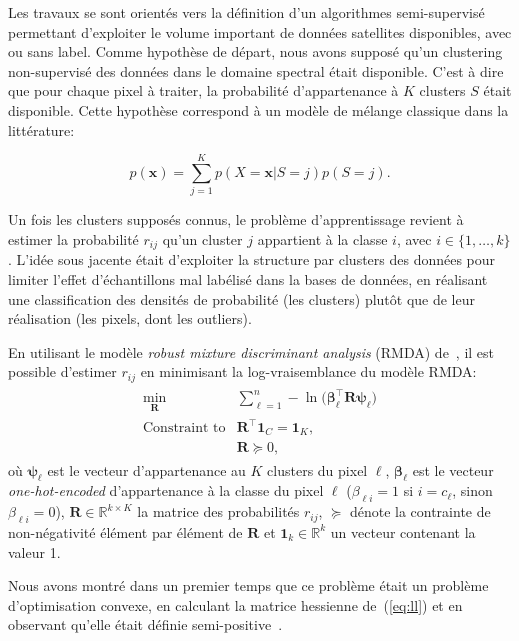 Les travaux se sont orientés vers la définition d'un algorithmes semi-supervisé permettant d'exploiter le volume important de données satellites disponibles, avec ou sans label. Comme hypothèse de départ, nous avons supposé qu'un clustering non-supervisé des données dans le domaine spectral était disponible. C'est à dire que pour chaque pixel à traiter, la probabilité d'appartenance à \(K\) clusters \(S\) était disponible. Cette hypothèse correspond à un modèle de mélange classique dans la littérature:

\[p(\mathbf{x}) = \sum_{j=1}^Kp(X=\mathbf{x}|S=j)p(S=j).\]

Un fois les clusters supposés connus, le problème d'apprentissage revient à estimer la probabilité \(r_{ij}\) qu'un cluster \(j\) appartient à la classe \(i\), avec \(i\in\{1, \ldots,k\}\). L'idée sous jacente était d'exploiter la structure par clusters des données pour limiter l'effet d'échantillons mal labélisé dans la bases de données, en réalisant une classification des densités de probabilité (les clusters) plutôt que de leur réalisation (les pixels, dont les outliers).

En utilisant le modèle \emph{robust mixture discriminant analysis} (RMDA) de~\cite{bouveyron-2009-robus-super}, il est possible d'estimer \(r_{ij}\) en minimisant la log-vraisemblance du modèle RMDA:
\begin{eqnarray}
  \label{eq:ll}
  \begin{array}{rl}
    \displaystyle{\min_{\mathbf{R}}}
   &\displaystyle{\sum_{\ell=1}^n -\ln\big(\boldsymbol{\beta}_\ell^\top\mathbf{R}\boldsymbol{\psi}_\ell\big)}\\
   \text{Constraint to} & \mathbf{R}^\top\mathbf{1}_C = \mathbf{1}_K,\\
  & \mathbf{R} \succcurlyeq 0,
  \end{array}
\end{eqnarray}
où \(\boldsymbol{\psi}_\ell\) est le vecteur d'appartenance au \(K\) clusters du pixel \(\ell\), \(\boldsymbol{\beta}_\ell\) est le vecteur \emph{one-hot-encoded} d'appartenance à la classe du pixel \(\ell\) (\(\beta_{\ell i}=1\) si \(i=c_\ell\), sinon \(\beta_{\ell i}=0\)),  \(\mathbf{R}\in\mathbb{R}^{k\times K}\) la matrice des probabilités \(r_{ij}\), \(\succcurlyeq\) dénote la contrainte de non-négativité élément par élément de \(\mathbf{R}\) et \(\mathbf{1}_k\in\mathbb{R}^k\) un vecteur contenant la valeur 1.

Nous avons montré dans un premier temps que ce problème était un problème d'optimisation convexe, en calculant la matrice hessienne de~(\ref{eq:ll}) et en observant qu'elle était définie semi-positive~\citep[Section~3.1]{GIRYFOUQUET2021320}.

